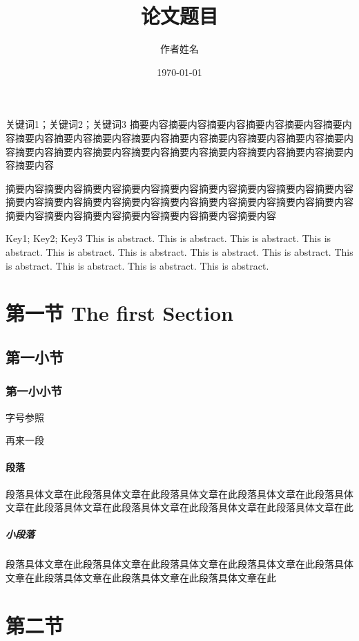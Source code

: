 \documentclass[a4paper,cs4size,UTF8,winfonts,boldfont,slantfont]{ctexart}
\title{论文题目} %
\author{作者姓名} %
\date{\today} %
\begin{document}
	
	
	\begin{cnabstract}{关键词1；关键词2；关键词3}
		摘要内容摘要内容摘要内容摘要内容摘要内容摘要内容摘要内容摘要内容摘要内容摘要内容摘要内容摘要内容摘要内容摘要内容摘要内容摘要内容摘要内容摘要内容摘要内容摘要内容摘要内容摘要内容摘要内容摘要内容摘要内容
		
		摘要内容摘要内容摘要内容摘要内容摘要内容摘要内容摘要内容摘要内容摘要内容摘要内容摘要内容摘要内容摘要内容摘要内容摘要内容摘要内容摘要内容摘要内容摘要内容摘要内容摘要内容摘要内容摘要内容摘要内容摘要内容
	\end{cnabstract}
	
	\begin{enabstract}{Key1; Key2; Key3}
		This is abstract. This is abstract. This is abstract. This is abstract. This is abstract. This is abstract. This is abstract. This is abstract. This is abstract. This is abstract. This is abstract. This is abstract. 
	\end{enabstract}
	
	\tableofcontents
	
	\section{第一节 The first Section}
	\subsection{第一小节}
	\subsubsection{第一小小节}
	字号参照
	
	再来一段
	\paragraph{段落}段落具体文章在此段落具体文章在此段落具体文章在此段落具体文章在此段落具体文章在此段落具体文章在此段落具体文章在此段落具体文章在此段落具体文章在此
	\subparagraph{小段落}段落具体文章在此段落具体文章在此段落具体文章在此段落具体文章在此段落具体文章在此段落具体文章在此段落具体文章在此段落具体文章在此
	\section{第二节}
\end{document}
